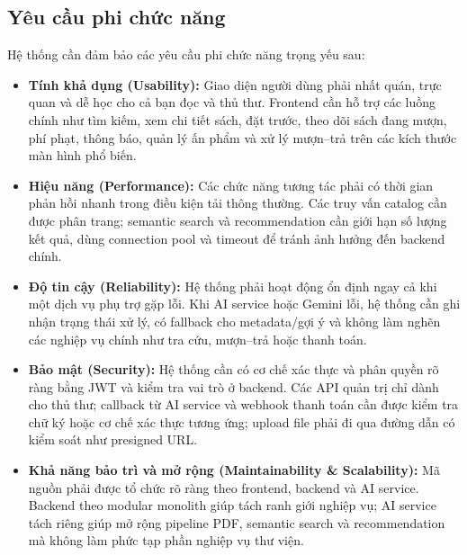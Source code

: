 \subsection{Yêu cầu phi chức năng}
\label{subsec:YeuCauPhiChucNang}
Hệ thống cần đảm bảo các yêu cầu phi chức năng trọng yếu sau:
\begin{itemize}
    \item \textbf{Tính khả dụng (Usability):} Giao diện người dùng phải nhất quán, trực quan và dễ học cho cả bạn đọc và thủ thư. Frontend cần hỗ trợ các luồng chính như tìm kiếm, xem chi tiết sách, đặt trước, theo dõi sách đang mượn, phí phạt, thông báo, quản lý ấn phẩm và xử lý mượn--trả trên các kích thước màn hình phổ biến.

    \item \textbf{Hiệu năng (Performance):} Các chức năng tương tác phải có thời gian phản hồi nhanh trong điều kiện tải thông thường. Các truy vấn catalog cần được phân trang; semantic search và recommendation cần giới hạn số lượng kết quả, dùng connection pool và timeout để tránh ảnh hưởng đến backend chính.

    \item \textbf{Độ tin cậy (Reliability):} Hệ thống phải hoạt động ổn định ngay cả khi một dịch vụ phụ trợ gặp lỗi. Khi AI service hoặc Gemini lỗi, hệ thống cần ghi nhận trạng thái xử lý, có fallback cho metadata/gợi ý và không làm nghẽn các nghiệp vụ chính như tra cứu, mượn--trả hoặc thanh toán.

    \item \textbf{Bảo mật (Security):} Hệ thống cần có cơ chế xác thực và phân quyền rõ ràng bằng JWT và kiểm tra vai trò ở backend. Các API quản trị chỉ dành cho thủ thư; callback từ AI service và webhook thanh toán cần được kiểm tra chữ ký hoặc cơ chế xác thực tương ứng; upload file phải đi qua đường dẫn có kiểm soát như presigned URL.

    \item \textbf{Khả năng bảo trì và mở rộng (Maintainability \& Scalability):} Mã nguồn phải được tổ chức rõ ràng theo frontend, backend và AI service. Backend theo modular monolith giúp tách ranh giới nghiệp vụ; AI service tách riêng giúp mở rộng pipeline PDF, semantic search và recommendation mà không làm phức tạp phần nghiệp vụ thư viện.
\end{itemize}

